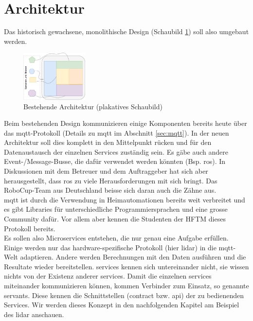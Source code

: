 \section{Architektur}
\label{sec:Architektur}
Das historisch gewachsene, monolithische Design (Schaubild \ref{fig:architecture_current_highlevel}) soll also umgebaut werden.
\begin{figure}[H]
	\centering
	\includegraphics[width=0.3\textwidth]{img/architecture-highlevel-today.pdf}
	\caption{Bestehende Architektur (plakatives Schaubild)}
	\label{fig:architecture_current_highlevel}
\end{figure}
Beim bestehenden Design kommunizieren einige Komponenten bereits heute über das \acrshort{mqtt}-Protokoll (Details zu \acrshort{mqtt} im Abschnitt \ref{sec:mqtt}). In der neuen Architektur soll dies komplett in den Mittelpunkt rücken und für den Datenaustausch der einzelnen Services zuständig sein. Es gäbe auch andere Event-/Message-Busse, die dafür verwendet werden könnten (Bsp. \Gls{ros}). In Diskussionen mit dem Betreuer und dem Auftraggeber hat sich aber herausgestellt, dass \Gls{ros} zu viele Herausforderungen mit sich bringt. Das RoboCup-Team aus Deutschland beisse sich daran auch die Zähne aus. \\
\acrshort{mqtt} ist durch die Verwendung in Heimautomationen bereits weit verbreitet und es gibt Libraries für unterschiedliche Programmiersprachen und eine grosse Community dafür. Vor allem aber kennen die Studenten der HFTM dieses Protokoll bereits. \\ Es sollen also Microservices entstehen, die nur genau eine Aufgabe erfüllen. Einige werden nur das hardware-spezifische Protokoll (hier \acrshort{lidar}) in die \acrshort{mqtt}-Welt adaptieren. Andere werden Berechnungen mit den Daten ausführen und die Resultate wieder bereitstellen. \Glspl{service} kennen sich untereinander nicht, sie wissen nichts von der Existenz anderer \glspl{service}. Damit die einzelnen \Glspl{service} miteinander kommunizieren können, kommen Verbinder zum Einsatz,  so genannte \Glspl{servant}. Diese kennen die Schnittstellen (\gls{contract} bzw. \acrshort{api}) der zu bedienenden Services. Wir werden dieses Konzept in den nachfolgenden Kapitel am Beispiel des \acrshort{lidar} anschauen.

